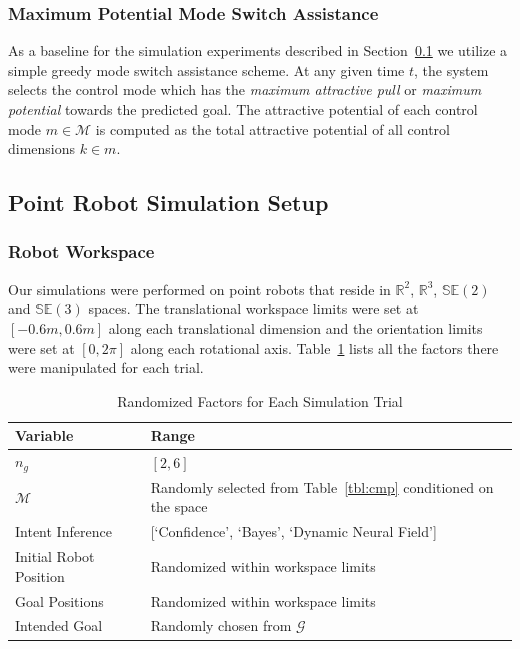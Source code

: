 \documentclass[conference]{IEEEtran}
\begin{document}
\subsubsection{Maximum Potential Mode Switch Assistance}\label{sssec:baseline}
As a baseline for the simulation experiments described in Section~\ref{ssec:sim} we utilize a simple greedy mode switch assistance scheme. At any given time $t$, the system selects the control mode which has the \textit{maximum attractive pull} or \textit{maximum potential} towards the predicted goal. 
The attractive potential of each control mode $m \in \mathcal{M}$ is computed as the total attractive potential of all control dimensions $k \in m$.

\subsection{Point Robot Simulation Setup}\label{ssec:sim}
\subsubsection{Robot Workspace}
Our simulations were performed on point robots that reside in $\mathbb{R}^2$, $\mathbb{R}^3$, $\mathbb{SE}(2)$ and $\mathbb{SE}(3)$ spaces. The translational workspace limits were set at $[-0.6m, 0.6m]$ along each translational dimension and the orientation limits were set at $[0, 2\pi]$ along each rotational axis. Table~\ref{tbl:manip} lists all the factors there were manipulated for each trial. 
\begin{table}[t]
	\centering
	\begin{tabular}{|p{3cm}|p{3cm}|}
		\hline
		\textbf{Variable} &\textbf{Range}  \\ \hline
		$n_g$ &  $[2,6]$ \\ \hline
		$\mathcal{M}$ & Randomly selected from Table~\ref{tbl:cmp} conditioned on the space\\ \hline
		Intent Inference & [`Confidence', `Bayes', `Dynamic Neural Field'] \\ \hline
		Initial Robot Position & Randomized within workspace limits \\ \hline
		Goal Positions & Randomized within workspace limits \\ \hline
		Intended Goal & Randomly chosen from $\mathcal{G}$ \\ \hline
	\end{tabular}
	\vspace{.2cm}
	\caption{Randomized Factors for Each Simulation Trial} 
	\label{tbl:manip}
	\vspace{-.5cm}
\end{table}
\end{document}
